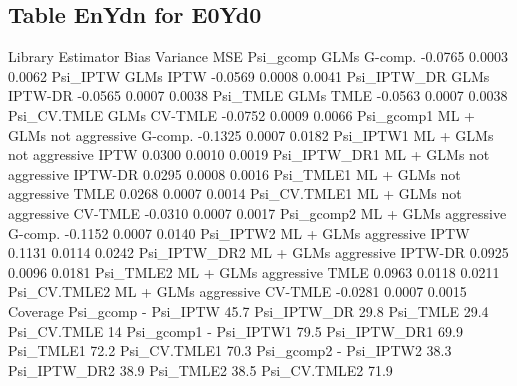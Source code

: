 \documentclass[11pt]{article}
\begin{document}
\subsection{Table EnYdn for E0Yd0}
\begin{Schunk}
\begin{Soutput}
                              Library Estimator    Bias Variance    MSE
Psi_gcomp                        GLMs   G-comp. -0.0765   0.0003 0.0062
Psi_IPTW                         GLMs      IPTW -0.0569   0.0008 0.0041
Psi_IPTW_DR                      GLMs   IPTW-DR -0.0565   0.0007 0.0038
Psi_TMLE                         GLMs      TMLE -0.0563   0.0007 0.0038
Psi_CV.TMLE                      GLMs   CV-TMLE -0.0752   0.0009 0.0066
Psi_gcomp1   ML + GLMs not aggressive   G-comp. -0.1325   0.0007 0.0182
Psi_IPTW1    ML + GLMs not aggressive      IPTW  0.0300   0.0010 0.0019
Psi_IPTW_DR1 ML + GLMs not aggressive   IPTW-DR  0.0295   0.0008 0.0016
Psi_TMLE1    ML + GLMs not aggressive      TMLE  0.0268   0.0007 0.0014
Psi_CV.TMLE1 ML + GLMs not aggressive   CV-TMLE -0.0310   0.0007 0.0017
Psi_gcomp2       ML + GLMs aggressive   G-comp. -0.1152   0.0007 0.0140
Psi_IPTW2        ML + GLMs aggressive      IPTW  0.1131   0.0114 0.0242
Psi_IPTW_DR2     ML + GLMs aggressive   IPTW-DR  0.0925   0.0096 0.0181
Psi_TMLE2        ML + GLMs aggressive      TMLE  0.0963   0.0118 0.0211
Psi_CV.TMLE2     ML + GLMs aggressive   CV-TMLE -0.0281   0.0007 0.0015
             Coverage
Psi_gcomp           -
Psi_IPTW        45.7%
Psi_IPTW_DR     29.8%
Psi_TMLE        29.4%
Psi_CV.TMLE       14%
Psi_gcomp1          -
Psi_IPTW1       79.5%
Psi_IPTW_DR1    69.9%
Psi_TMLE1       72.2%
Psi_CV.TMLE1    70.3%
Psi_gcomp2          -
Psi_IPTW2       38.3%
Psi_IPTW_DR2    38.9%
Psi_TMLE2       38.5%
Psi_CV.TMLE2    71.9%
\end{Soutput}
\end{Schunk}
\end{document}
